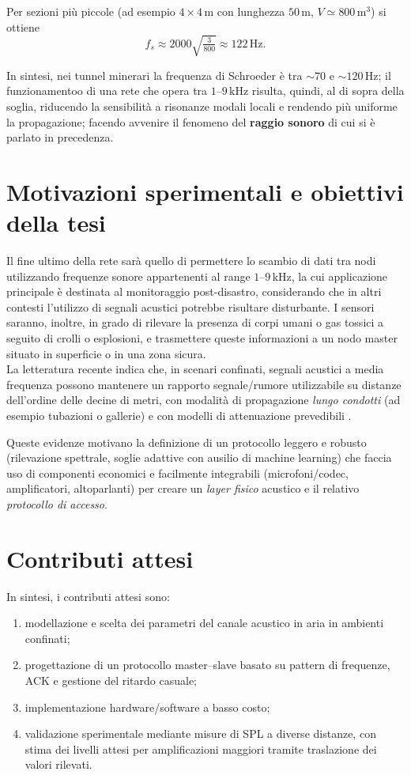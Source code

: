 Per sezioni più piccole (ad esempio $4 \times 4 \,\text{m}$ con lunghezza $50\,\text{m}$, $V \simeq 800\,\text{m}^3$) si ottiene
\[
f_s \approx 2000 \sqrt{\tfrac{3}{800}} \approx 122 \,\text{Hz}.
\]

In sintesi, nei tunnel minerari la frequenza di Schroeder è tra $\sim 70$ e $\sim 120 \,\text{Hz}$; il funzionamentoo di una rete che
opera tra  $1$--$9 \,\text{kHz}$ 
risulta, quindi, al di sopra della soglia, riducendo la sensibilità a risonanze modali locali e rendendo più uniforme la propagazione;
facendo avvenire il fenomeno del \textbf{raggio sonoro} di cui si è parlato in precedenza.


\section{Motivazioni sperimentali e obiettivi della tesi}

Il fine ultimo della rete sarà quello di permettere lo scambio di dati tra nodi utilizzando frequenze sonore appartenenti al range $1$--$9 \,\text{kHz}$, 
la cui applicazione principale è destinata al monitoraggio post-disastro, considerando che in altri contesti l'utilizzo di segnali acustici potrebbe 
risultare disturbante. 
I sensori saranno, inoltre, in grado di rilevare la presenza di corpi umani o gas tossici a seguito di crolli o esplosioni,
e trasmettere queste informazioni a un nodo master situato in superficie o in una zona sicura. \\
La letteratura recente indica che, in scenari confinati, segnali acustici a media frequenza possono mantenere 
un rapporto segnale/rumore utilizzabile su distanze dell'ordine delle decine di metri, con modalità di propagazione 
\emph{lungo condotti} (ad esempio tubazioni o gallerie) e con modelli di attenuazione prevedibili 
\citep{acoustic2024}.  

Queste evidenze motivano la definizione di un protocollo leggero e robusto (rilevazione spettrale, soglie adattive con ausilio di machine learning) 
che faccia uso di componenti economici e facilmente integrabili (microfoni/codec, 
amplificatori, altoparlanti) per creare un \emph{layer fisico} acustico e il relativo \emph{protocollo di accesso}.

\section{Contributi attesi}
\label{sec:contributi_attesi}
In sintesi, i contributi attesi sono: 
\begin{enumerate}
\item modellazione e scelta dei parametri del canale acustico in aria in ambienti confinati;
\item progettazione di un protocollo master--slave basato su pattern di frequenze, ACK e gestione del ritardo casuale;
\item implementazione hardware/software a basso costo;
\item validazione sperimentale mediante misure di SPL a diverse distanze, con stima dei livelli attesi per amplificazioni maggiori tramite traslazione dei valori rilevati.
\end{enumerate}
